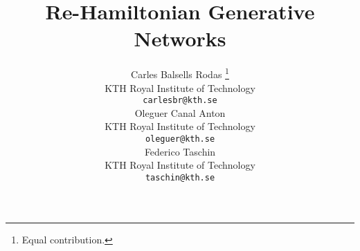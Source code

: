 \documentclass{article}
\title{Re-Hamiltonian Generative Networks}
\author{%
  Carles Balsells Rodas \thanks{Equal contribution.}\\
  KTH Royal Institute of Technology\\
  \texttt{carlesbr@kth.se}\\
   \And
   Oleguer Canal Anton \printfnsymbol{1}\\
   KTH Royal Institute of Technology \\
   \texttt{oleguer@kth.se} \\
   \And
   Federico Taschin \printfnsymbol{1}\\
   KTH Royal Institute of Technology \\
   \texttt{taschin@kth.se} \\
}
\begin{document}
\maketitle




\small

\end{document}
